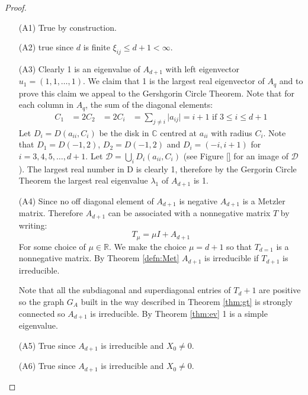 \documentclass[8pt]{article} %
\theoremstyle{definition}
\begin{document}
\begin{proof}
\begin{itemize}
 \item[(A1)]  True by construction.
 
 \item[(A2)]  true since $d$ is finite $\xi_{ij} \leq d+1 < \infty$.
 
 \item[(A3)] Clearly 1 is an eigenvalue of $A_{d+1}$ with left eigenvector $u_1 = (1,1,\dots,1)$.  We claim that 1 is the largest real eigenvector of $A_q$ and to prove this claim we appeal to the Gershgorin Circle Theorem.  Note that for each column in $A_q$, the sum of the diagonal elements:
\begin{align*}
 C_1 &= 2
 C_2 &= 2
 C_i &= \sum_{j \neq i} \lvert a_{ij} \rvert = i+1  \text{      if     }  3\leq i \leq d+1 
\end{align*}
 Let $D_i = D(a_{ii}, C_i)$ be the disk in $\mathbb{C}$ centred at $a_{ii}$ with radius $C_i$.  Note that $D_1 = D(-1,2)$, $D_2 = D(-1,2)$  and  $D_i = (-i,i+1)$ for $i = 3,4,5,\dots, d+1$. Let $\mathcal{D} = \bigcup_i D_i(a_{ii},C_i)$ (see Figure \ref{} for an image of $\mathcal{D}$).  The largest real number in  D is clearly 1, therefore by the Gergorin Circle Theorem the largest real eigenvalue $\lambda_1$ of $A_{d+1}$ is 1.    
 
 \item[(A4)]  Since no off diagonal element of $A_{d+1}$ is negative $A_{d+1}$ is a Metzler matrix.  Therefore $A_{d+1}$ can be associated with a nonnegative matrix $T$ by writing:
\[T_\mu = \mu I + A_{d+1}\]
For some choice of $\mu \in \mathbb{R}$.  We make the choice $\mu = d+1$ so that $T_{d=1}$ is a nonnegative matrix.  By Theorem \ref{defn:Met} $A_{d+1}$ is irreducible if $T_{d+1}$ is irreducible.  

Note that all the subdiagonal and superdiagonal entries of $T_d+1$ are positive so the graph $G_A$ built in the way described in Theorem \ref{thm:gt} is strongly connected so $A_{d+1}$ is irreducible.  By Theorem \ref{thm:ev} 1 is a simple eigenvalue.  
 \item[(A5)] True since $A_{d+1}$ is irreducible and $X_{0} \neq 0$.
 \item[(A6)] True since $A_{d+1}$ is irreducible and $X_{0} \neq 0$.
\end{itemize}
\end{proof}
\end{document}
